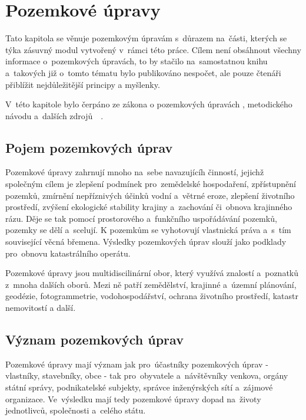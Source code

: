 \chapter{Pozemkové úpravy}
\label{2-pu}

Tato kapitola se věnuje pozemkovým úpravám s~důrazem na~části, kterých se týka zásuvný modul vytvořený v~rámci této práce. Cílem není obsáhnout všechny informace o~pozemkových úpravách, to by stačilo na~samostatnou knihu a~takových již o~tomto tématu bylo publikováno nespočet, ale pouze čtenáři přiblížit nejdůležitější principy a myšlenky.

V~této kapitole bylo čerpáno ze zákona o pozemkových úpravách \citep{pu_zakon}, metodického návodu \citep{metodicky_navod} a~dalších zdrojů~\citep{pu_skripta}~\citep{pu_cr}.

\section{Pojem pozemkových úprav}
\label{pojem_pu}

Pozemkové úpravy zahrnují mnoho na~sebe navazujícíh činností, jejichž společným cílem je zlepšení podmínek pro~zemědelské hospodaření, zpřístupnění pozemků, zmírnění nepříznivých účinků vodní a~větrné eroze, zlepšení životního prostředí, zvýšení ekologické stability krajiny a~zachování či~obnova krajinného rázu. Děje se tak pomocí prostorového a~funkčního uspořádávání pozemků, pozemky se dělí a~scelují. K pozemkům se vyhotovují vlastnická práva a~s~tím související věcná břemena. Výsledky pozemkových úprav slouží jako podklady pro~obnovu katastrálního operátu.

Pozemkové úpravy jsou multidiscilinární obor, který využívá znalostí a~poznatků z~mnoha dalších oborů. Mezi ně patří zemědělství, krajinné a~územní plánování, geodézie, fotogrammetrie, vodohospodářství, ochrana životního prostředí, katastr nemovitostí a další.

\section{Význam pozemkových úprav}
\label{vyznam_pu}

Pozemkové úpravy mají význam jak pro~účastníky pozemkových úprav - vlastníky, stavebníky, obce - tak pro~obyvatele a~návštěvníky venkova, orgány státní správy, podnikatelské subjekty, správce inženýrských sítí a~zájmové organizace. Ve~výsledku mají tedy pozemkové úpravy dopad na~životy jednotlivců, společnosti a~celého státu.

